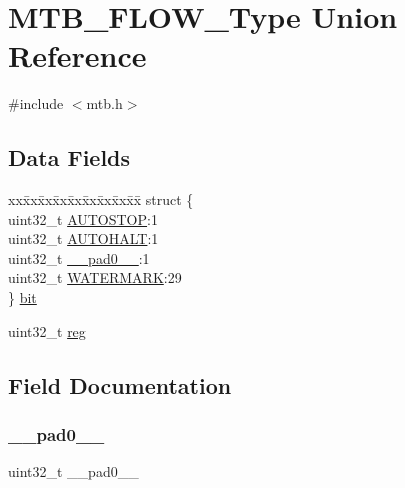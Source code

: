 \hypertarget{union_m_t_b___f_l_o_w___type}{}\section{M\+T\+B\+\_\+\+F\+L\+O\+W\+\_\+\+Type Union Reference}
\label{union_m_t_b___f_l_o_w___type}


{\ttfamily \#include $<$mtb.\+h$>$}

\subsection*{Data Fields}
\begin{DoxyCompactItemize}
\item 
\begin{tabbing}
xx\=xx\=xx\=xx\=xx\=xx\=xx\=xx\=xx\=\kill
struct \{\\
\>uint32\_t \mbox{\hyperlink{union_m_t_b___f_l_o_w___type_ab43287f732cecb3b4eae74fe09219874}{AUTOSTOP}}:1\\
\>uint32\_t \mbox{\hyperlink{union_m_t_b___f_l_o_w___type_acef191ae25b39e5b72639eb4c0a465ce}{AUTOHALT}}:1\\
\>uint32\_t \mbox{\hyperlink{union_m_t_b___f_l_o_w___type_a3e57c2ef1c3ffb36722f000cc1156824}{\_\_pad0\_\_}}:1\\
\>uint32\_t \mbox{\hyperlink{union_m_t_b___f_l_o_w___type_ab5b87210f653c3e6c812491b541bf83e}{WATERMARK}}:29\\
\} \mbox{\hyperlink{union_m_t_b___f_l_o_w___type_a27e916a2f73356523b6deb19bc5a7748}{bit}}\\

\end{tabbing}\item 
uint32\+\_\+t \mbox{\hyperlink{union_m_t_b___f_l_o_w___type_a6b91636401516a477989a336376d7b40}{reg}}
\end{DoxyCompactItemize}


\subsection{Field Documentation}
\mbox{\label{union_m_t_b___f_l_o_w___type_a3e57c2ef1c3ffb36722f000cc1156824}} 
\subsubsection{\texorpdfstring{\_\_pad0\_\_}{\_\_pad0\_\_}}
{\footnotesize\ttfamily uint32\+\_\+t \+\_\+\+\_\+pad0\+\_\+\+\_\+}

